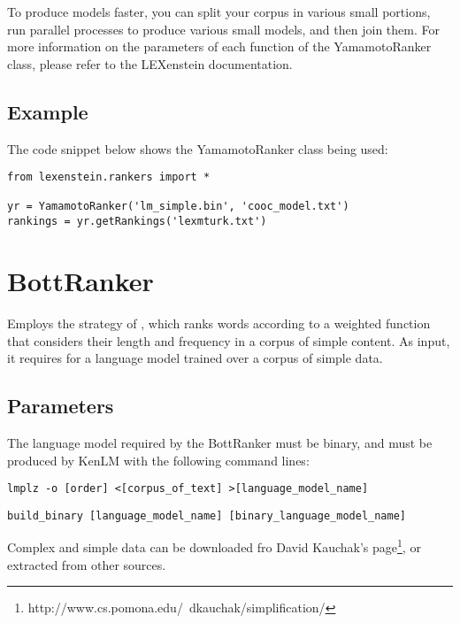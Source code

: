 To produce models faster, you can split your corpus in various small portions, run parallel processes to produce various small models, and then join them. For more information on the parameters of each function of the YamamotoRanker class, please refer to the LEXenstein documentation.

\subsection{Example}

The code snippet below shows the YamamotoRanker class being used:

\begin{lstlisting}
from lexenstein.rankers import *

yr = YamamotoRanker('lm_simple.bin', 'cooc_model.txt')
rankings = yr.getRankings('lexmturk.txt')
\end{lstlisting}















\section{BottRanker}

Employs the strategy of \cite{Bott2012}, which ranks words according to a weighted function that considers their length and frequency in a corpus of simple content. As input, it requires for a language model trained over a corpus of simple data.

\subsection{Parameters}

The language model required by the BottRanker must be binary, and must be produced by KenLM with the following command lines:

\begin{lstlisting}
lmplz -o [order] <[corpus_of_text] >[language_model_name]
\end{lstlisting}
\begin{lstlisting}
build_binary [language_model_name] [binary_language_model_name]
\end{lstlisting}

Complex and simple data can be downloaded fro David Kauchak's page\footnote{http://www.cs.pomona.edu/~dkauchak/simplification/}, or extracted from other sources.

